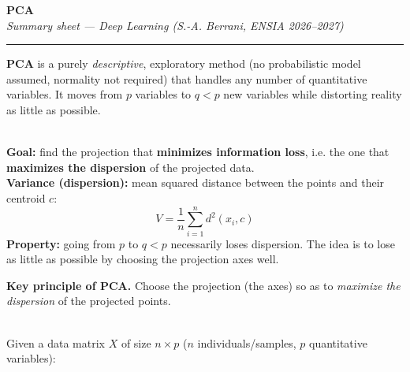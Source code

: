 \documentclass[10pt,a4paper]{article}
\begin{document}
\begin{center}
    {\LARGE\bfseries\color{themeblue} PCA}\\[3pt]
    {\small\itshape Summary sheet --- Deep Learning (S.-A. Berrani, ENSIA 2026--2027)}\\[3pt]
    \textcolor{themeblue}{\rule{\textwidth}{0.6pt}}
\end{center}

\begin{tcolorbox}[
    colframe=themeblue,
    colback=lightbg,
    coltitle=white,
    fonttitle=\bfseries\sffamily,
    title={Core idea \& notation},
    arc=2mm,
    boxrule=0.6pt,
    left=8pt, right=8pt, top=6pt, bottom=6pt
]
\textbf{PCA} is a purely \textit{descriptive}, exploratory method (no probabilistic model assumed, normality not required) that handles any number of quantitative variables. It moves from $p$ variables to $q < p$ new variables while distorting reality as little as possible.
\end{tcolorbox}

\vspace{4pt}

\\[4pt]
\textbf{Goal:} find the projection that \textbf{minimizes information loss}, i.e. the one that \textbf{maximizes the dispersion} of the projected data.\\
\textbf{Variance (dispersion):} mean squared distance between the points and their centroid $c$:
\[
V = \frac{1}{n} \sum_{i=1}^n d^2(x_i, c)
\]
\textbf{Property:} going from $p$ to $q < p$ necessarily loses dispersion. The idea is to lose as little as possible by choosing the projection axes well.\par\vspace{4pt}
\begin{tcolorbox}[
    colframe=accentred,
    colback=white,
    arc=1.5mm,
    boxrule=0.5pt,
    left=8pt, right=8pt, top=5pt, bottom=5pt
]
\textbf{Key principle of PCA.} Choose the projection (the axes) so as to \textit{maximize the dispersion} of the projected points.
\end{tcolorbox}

\vspace{6pt}

\\[4pt]
Given a data matrix $X$ of size $n \times p$ ($n$ individuals/samples, $p$ quantitative variables):
\end{document}

